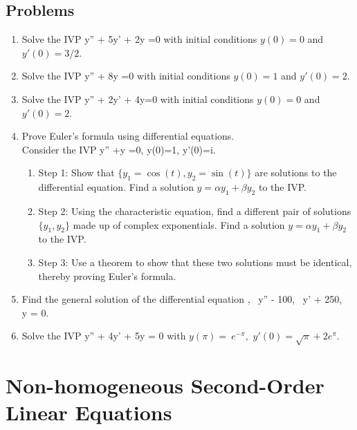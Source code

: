 \documentclass[12pt]{book}
\begin{document}
\section{Problems}

\begin{enumerate}

\item
  Solve the IVP
   y'' + 5y' + 2y =0
  \eee
  with initial conditions $y(0)=0$ and $y'(0)=3/2$.

\item
  Solve the IVP
   y'' + 8y =0
  \eee
  with initial conditions $y(0)=1$ and $y'(0)=2$.

\item
  Solve the IVP
  \bee
  y'' + 2y' + 4y=0
  \eee
  with initial conditions $y(0)=0$ and $y'(0)=2$.

\item
  Prove Euler's formula using differential equations. \\
  Consider the IVP
  \bee
  y'' +y =0, \qquad y(0)=1, \quad y'(0)=i.
  \eee
  \begin{enumerate}
    \item Step 1: Show that $\{y_1=\cos(t),y_2=\sin(t)\}$ are solutions
      to the differential equation. Find a solution $y=\alpha y_1 + \beta y_2$
      to the IVP.
    \item Step 2: Using the characteristic equation, find a different pair
      of solutions $\{y_1,y_2\}$ made up of complex exponentials. Find a
      solution $y=\alpha y_1 + \beta y_2$ to the IVP.
    \item Step 3: Use a theorem to show that these two solutions must be
      identical, thereby proving Euler's formula.
  \end{enumerate}

\item
  Find the general solution of the differential equation
  ,  \, y'' - 100,  \, y' + 250,  \, y = 0.
  \eee


\item
  Solve the IVP
  \bee
  y'' + 4y' + 5y = 0
  \eee
  with $y(\pi) =\ e^{-\pi},$ $y' (0) = \sqrt{\pi} + 2e^\pi$.

\end{enumerate}


\chapter{Non-homogeneous Second-Order Linear Equations}
\end{document}
